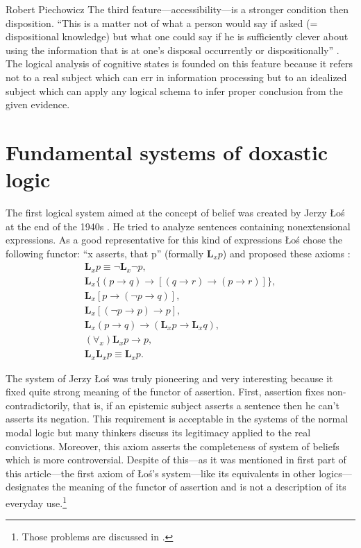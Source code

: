 \begin{artengenv}{Robert Piechowicz}
The third feature---accessibility---is a stronger condition then disposition. ``This is a matter not of what a person would say if asked (= dispositional knowledge) but what one could say if he is sufficiently clever about using the information that is at one’s disposal occurrently or dispositionally''
\parencite[][p.478]{jacquette_epistemic_2002}.
The logical analysis of cognitive states is founded on this feature because it refers not to a real subject which can err in information processing but to an idealized subject which can apply any logical schema to infer proper conclusion from the given evidence.
	
\section{Fundamental systems of doxastic logic}

\indent The first logical system aimed at the concept of belief was created by Jerzy \L{}o\'{s} at the end of the 1940s
\parencite{los_logiki_1948}.
He tried to analyze sentences containing nonextensional expressions. As a good representative for this kind of expressions \L{}o\'{s} chose the following functor: ``x asserts, that p'' (formally $\mathbf{L}_{x}p$) and proposed these axioms
\parencite[see][p.251]{lechniak_przekonania_2011}:
\begin{gather}
	\mathbf{L}_{x}p\equiv \neg \mathbf{L}_{x}\neg p,\tag*{1.} \\
	\mathbf{L}_{x}\{(p\rightarrow q)\rightarrow [(q\rightarrow r)\rightarrow (p\rightarrow r)]\},\tag*{2.}\\
	\mathbf{L}_{x}[p\rightarrow (\neg p\rightarrow q)],\tag*{3.}\\
	\mathbf{L}_{x}[(\neg p\rightarrow p)\rightarrow p],\tag*{4.}\\
	\mathbf{L}_{x}(p\rightarrow q)\rightarrow (\mathbf{L}_{x}p\rightarrow \mathbf{L}_{x}q),\tag*{5.}\\
	(\forall_{x})\mathbf{L}_{x}p\rightarrow  p,\tag*{6.}\\
	\mathbf{L}_{x}\mathbf{L}_{x} p\equiv\mathbf{ L}_{x}p.\tag*{7.}
\end{gather}

The system of Jerzy \L{}o\'{s} was truly pioneering and very interesting because it fixed quite strong meaning of the functor of assertion. First, assertion fixes non-contradictorily, that is, if an epistemic subject asserts a sentence then he can’t asserts its negation. This requirement is acceptable in the systems of the normal modal logic but many thinkers discuss its legitimacy applied to the real convictions. Moreover, this axiom asserts the completeness of system of beliefs which is more controversial. Despite of this---as it was mentioned in first part of this article---the first axiom of \L{}o\'{s}’s system---like its equivalents in other logics---designates the meaning of the functor of assertion and is not a description of its everyday use.\footnote{Those problems are discussed in
\parencites[][p.80-82, 93-94]{marciszewski_podstawy_1972}{poczobut_sprzecznosci_1999}.}


\end{artengenv}
